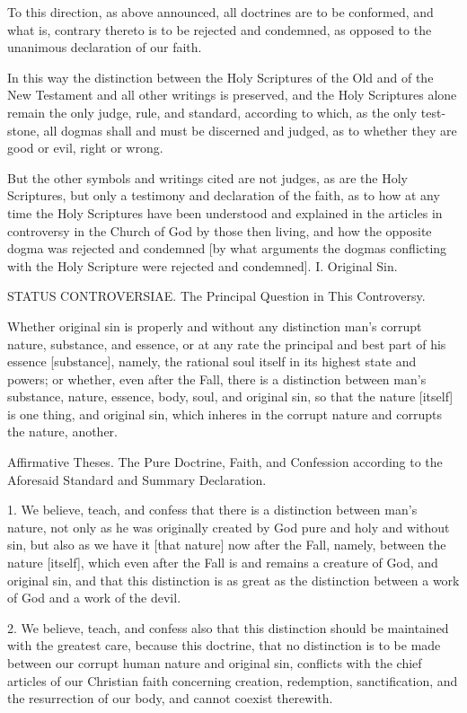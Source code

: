 To this direction, as above announced, all doctrines are to be conformed, and what is, contrary thereto is to be rejected and condemned, as opposed to the unanimous declaration of our faith.

In this way the distinction between the Holy Scriptures of the Old and of the New Testament and all other writings is preserved, and the Holy Scriptures alone remain the only judge, rule, and standard, according to which, as the only test-stone, all dogmas shall and must be discerned and judged, as to whether they are good or evil, right or wrong.

But the other symbols and writings cited are not judges, as are the Holy Scriptures, but only a testimony and declaration of the faith, as to how at any time the Holy Scriptures have been understood and explained in the articles in controversy in the Church of God by those then living, and how the opposite dogma was rejected and condemned [by what arguments the dogmas conflicting with the Holy Scripture were rejected and condemned].
I. Original Sin.

STATUS CONTROVERSIAE.
The Principal Question in This Controversy.

Whether original sin is properly and without any distinction man's corrupt nature, substance, and essence, or at any rate the principal and best part of his essence [substance], namely, the rational soul itself in its highest state and powers; or whether, even after the Fall, there is a distinction between man's substance, nature, essence, body, soul, and original sin, so that the nature [itself] is one thing, and original sin, which inheres in the corrupt nature and corrupts the nature, another.

Affirmative Theses.
The Pure Doctrine, Faith, and Confession according to the Aforesaid Standard and Summary Declaration.

1. We believe, teach, and confess that there is a distinction between man's nature, not only as he was originally created by God pure and holy and without sin, but also as we have it [that nature] now after the Fall, namely, between the nature [itself], which even after the Fall is and remains a creature of God, and original sin, and that this distinction is as great as the distinction between a work of God and a work of the devil.

2. We believe, teach, and confess also that this distinction should be maintained with the greatest care, because this doctrine, that no distinction is to be made between our corrupt human nature and original sin, conflicts with the chief articles of our Christian faith concerning creation, redemption, sanctification, and the resurrection of our body, and cannot coexist therewith.

